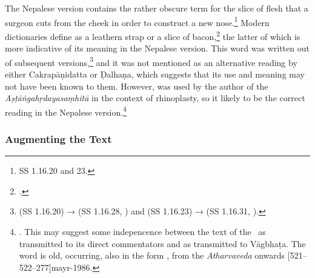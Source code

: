 The Nepalese version contains the rather obscure term  for the slice
of flesh that a surgeon cuts from the cheek in order to construct a new
nose.\footnote{SS 1.16.20 and 23.} Modern dictionaries define  as a
    leathern strap or a slice of bacon,\footcites[1385]{apte-prac}[917]{moni-sans} the
    latter of which is more indicative of its meaning in the Nepalese version. This
    word was written out of subsequent versions,\footnote{ (SS 1.16.20) →
         (SS 1.16.28, \cite[81]{vulgate}) and 
        (SS 1.16.23) →  (SS 1.16.31, \cite[81]{vulgate}).} and it was
        not mentioned as an alternative reading by either Cakrapāṇidatta or Ḍalhaṇa, which
        suggests that its use and meaning may not have been known to them. However,
         was used by the author of the \emph{Aṣṭāṅgahṛdayasaṃhitā} in the
        context of rhinoplasty, so it likely to be the correct reading in the Nepalese
        version.\footnote{. This may suggest some indepencence 
        between
            the text of the \SS\ as transmitted to its direct commentators and as transmitted
            to Vāgbhaṭa. The word  is old, occurring, also in the form
            , from the \emph{Atharvaveda} onwards
            [521--522--277]{mayr-1986}.}



%

\subsubsection{Augmenting the Text}

